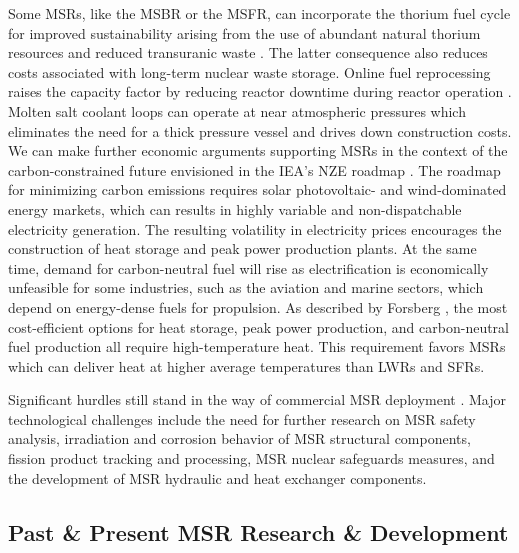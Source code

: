 Some \glspl{MSR}, like the \gls{MSBR} or the \gls{MSFR}, can
incorporate the thorium fuel cycle for improved sustainability arising from the
use of abundant natural thorium resources and reduced transuranic waste
\cite{heuer_towards_2014}. The latter consequence also reduces costs
associated with long-term nuclear waste storage. Online fuel reprocessing raises the capacity
factor by reducing reactor downtime during reactor operation \cite{dolan_1_2017}.
Molten salt coolant loops can operate at near atmospheric pressures which eliminates the need for a
thick pressure vessel and drives down construction costs. We can make further economic arguments
supporting \glspl{MSR} in the context of the
carbon-constrained future envisioned in the \gls{IEA}'s \gls{NZE} roadmap
\cite{iea_net_2021}. The roadmap for minimizing carbon emissions requires solar photovoltaic- and
wind-dominated energy markets, which can results in highly variable and non-dispatchable
electricity generation. The resulting volatility in electricity prices
encourages the construction of heat storage and peak power
production plants. At the same time, demand for carbon-neutral
fuel will rise as electrification is economically unfeasible
for some industries, such as the aviation and marine sectors, which depend on
energy-dense fuels for propulsion. As described by Forsberg
\cite{forsberg_market_2020}, the most cost-efficient options for heat storage, peak power
production, and carbon-neutral fuel production all require high-temperature heat.
This requirement favors \glspl{MSR} which can deliver heat at higher average
temperatures than \glspl{LWR} and \glspl{SFR}.

Significant hurdles still stand in the way of commercial \gls{MSR} deployment \cite{dolan_27_2017}.
Major technological challenges include the need for further research on \gls{MSR} safety analysis,
irradiation and corrosion behavior of \gls{MSR} structural components, fission product tracking
and processing, \gls{MSR} nuclear safeguards measures, and the development of \gls{MSR} hydraulic
and heat exchanger components.

\subsection{Past \& Present \gls{MSR} Research \& Development}


